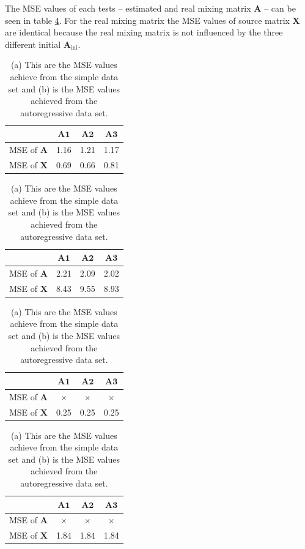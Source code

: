 \noindent
The MSE values of each tests -- estimated and real mixing matrix $\mathbf{A}$ -- can be seen in table \ref{tab:iniA}. For the real mixing matrix the MSE values of source matrix $\mathbf{X}$ are identical because the real mixing matrix is not influenced by the three different initial $\mathbf{A}_{\text{ini}}$.
\begin{table}[H]
\begin{minipage}{.5\linewidth}
\centering
\begin{tabular}{|c|c|c|c|}
\hline 
 & $\mathbf{A1}$ & $\mathbf{A2}$ & $\mathbf{A3}$ \\ 
\hline 
MSE of $\mathbf{A}$ & 1.16 & 1.21 & 1.17 \\ 
\hline 
MSE of $\mathbf{X}$ & 0.69 & 0.66 & 0.81 \\ 
\hline 
\end{tabular} 
\end{minipage}
\begin{minipage}{.5\linewidth}
\centering
\begin{tabular}{|c|c|c|c|}
\hline
 & $\mathbf{A1}$ & $\mathbf{A2}$ & $\mathbf{A3}$ \\ 
\hline 
MSE of $\mathbf{A}$ & 2.21 & 2.09 & 2.02 \\ 
\hline 
MSE of $\mathbf{X}$ & 8.43 & 9.55 & 8.93 \\ 
\hline
\end{tabular} 
\end{minipage}
\begin{minipage}{.5\linewidth}
\centering
\begin{tabular}{|c|c|c|c|}
\hline 
 & $\mathbf{A1}$ & $\mathbf{A2}$ & $\mathbf{A3}$ \\ 
\hline 
MSE of $\mathbf{A}$ & $\times$ & $\times$ & $\times$ \\ 
\hline 
MSE of $\mathbf{X}$ & 0.25 & 0.25 & 0.25 \\ 
\hline 
\end{tabular} 
\end{minipage}
\begin{minipage}{.5\linewidth}
\centering
\begin{tabular}{|c|c|c|c|}
\hline
 & $\mathbf{A1}$ & $\mathbf{A2}$ & $\mathbf{A3}$ \\ 
\hline 
MSE of $\mathbf{A}$ & $\times$ & $\times$ & $\times$ \\ 
\hline 
MSE of $\mathbf{X}$ & 1.84 & 1.84 & 1.84 \\ 
\hline
\end{tabular} 
\end{minipage}
\caption{(a) This are the MSE values achieve from the simple data set and (b) is the MSE values achieved from the autoregressive data set.}
\label{tab:iniA}
\end{table}
